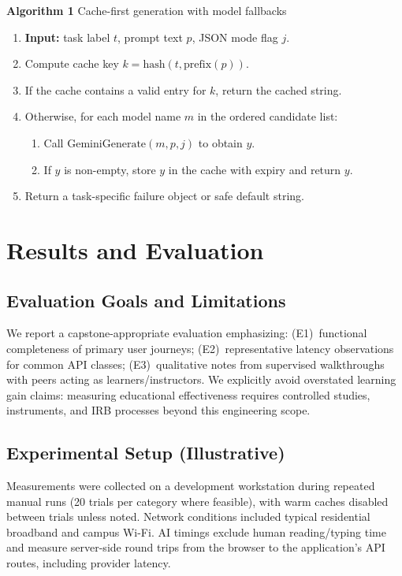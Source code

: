\documentclass[conference]{IEEEtran}
\begin{document}
\noindent\textbf{Algorithm 1} Cache-first generation with model fallbacks
\begin{enumerate}
\item \textbf{Input:} task label $t$, prompt text $p$, JSON mode flag $j$.
\item Compute cache key $k = \mathrm{hash}(t,\mathrm{prefix}(p))$.
\item If the cache contains a valid entry for $k$, return the cached string.
\item Otherwise, for each model name $m$ in the ordered candidate list:
\begin{enumerate}
\item Call $\mathrm{GeminiGenerate}(m,p,j)$ to obtain $y$.
\item If $y$ is non-empty, store $y$ in the cache with expiry and return $y$.
\end{enumerate}
\item Return a task-specific failure object or safe default string.
\end{enumerate}

\section{Results and Evaluation}

\subsection{Evaluation Goals and Limitations}

We report a capstone-appropriate evaluation emphasizing: (E1)~functional completeness of primary user journeys; (E2)~representative latency observations for common API classes; (E3)~qualitative notes from supervised walkthroughs with peers acting as learners/instructors. We explicitly avoid overstated learning gain claims: measuring educational effectiveness requires controlled studies, instruments, and IRB processes beyond this engineering scope.

\subsection{Experimental Setup (Illustrative)}

Measurements were collected on a development workstation during repeated manual runs (20 trials per category where feasible), with warm caches disabled between trials unless noted. Network conditions included typical residential broadband and campus Wi-Fi. AI timings exclude human reading/typing time and measure server-side round trips from the browser to the application's API routes, including provider latency.
\end{document}
